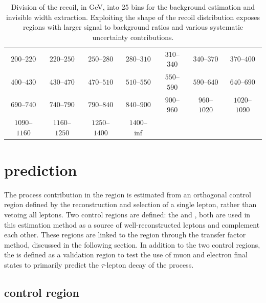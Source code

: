 \begin{table}[htb]
    \centering
    \begin{tabular}{ccccccc}
        $200$--$220$ & $220$--$250$ & $250$--$280$ & $280$--$310$ & $310$--$340$ & $340$--$370$ & $370$--$400$ \\
        $400$--$430$ & $430$--$470$ & $470$--$510$ & $510$--$550$ & $550$--$590$ & $590$--$640$ & $640$--$690$ \\
        $690$--$740$ & $740$--$790$ & $790$--$840$ & $840$--$900$ & $900$--$960$ & $960$--$1020$ & $1020$--$1090$ \\
        $1090$--$1160$ & $1160$--$1250$ & $1250$--$1400$ & $1400$--$\inf$
    \end{tabular}
    \caption[Recoil bins.]{
        Division of the recoil, in GeV, into 25 bins for the background estimation and \PZ invisible width extraction. Exploiting the shape of the recoil distribution exposes regions with larger signal to background ratios and various systematic uncertainty contributions.
    }
    \label{tab:met-bins}
\end{table}

\section{\IWlv prediction}\label{sec:wjets-prediction}

The \IWlv process contribution in the \metplusjets region is estimated from an orthogonal control region defined by the reconstruction and selection of a single lepton, rather than vetoing all leptons. Two control regions are defined: the \muplusjets and \eleplusjets, both are used in this estimation method as a source of well-reconstructed leptons and complement each other.  These regions are linked to the \metplusjets region through the transfer factor method, discussed in the following section. In addition to the two control regions, the \tauplusjets is defined as a validation region to test the use of muon and electron final states to primarily predict the $\tau$-lepton decay of the \IWlv process.


\subsection{\muplusjets control region}

